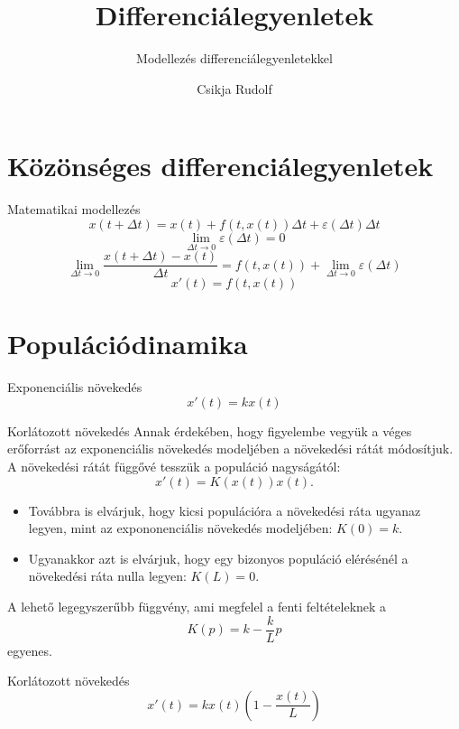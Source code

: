 \documentclass[10pt]{beamer}
\title{Differenciálegyenletek}
\subtitle{Modellezés differenciálegyenletekkel}
\date{}
\author{Csikja Rudolf}
\institute{Budapesti Műszaki és Gazdaságtudományi Egyetem\\Matemaikai Intézet, Analízis Tanszék}
\newcommand{\dlt}{\Delta t}
\begin{document}
\maketitle


\section{Közönséges differenciálegyenletek}
\begin{frame}[t]{Matematikai modellezés}
\[x(t+\dlt) = x(t) + f(t, x(t))\dlt + \varepsilon(\dlt) \dlt\]
 \[\lim_{\dlt \to 0} \varepsilon(\dlt) = 0\]
 \[\lim_{\dlt \to 0} \frac{x(t+\dlt) - x(t)}{\dlt} = f(t, x(t)) + \lim_{\dlt \to 0} \varepsilon(\dlt)\]
  \[x'(t) = f(t, x(t))\]
\end{frame}

\section{Populációdinamika}
\begin{frame}[t]{Exponenciális növekedés}
\[x'(t) = k x(t)\]
\end{frame}

\begin{frame}[t]{Korlátozott növekedés}
Annak érdekében, hogy figyelembe vegyük a véges erőforrást
az exponenciális növekedés modeljében a növekedési rátát módosítjuk.
A növekedési rátát függővé tesszük a populáció nagyságától:
\[x'(t) = K(x(t)) x(t).\]
\begin{itemize}
\item Továbbra is elvárjuk, hogy kicsi populációra a növekedési ráta ugyanaz legyen,
mint az expononenciális növekedés modeljében: $K(0) = k.$
\item Ugyanakkor azt is elvárjuk, hogy egy bizonyos populáció elérésénél a növekedési
ráta nulla legyen: $K(L) = 0.$
\end{itemize}
A lehető legegyszerűbb függvény, ami megfelel a fenti feltételeknek a
\[K(p) = k - \frac{k}{L}p\]
egyenes.
\end{frame}

\begin{frame}[t]{Korlátozott növekedés}
 \[x'(t) = k x(t)\left(1 - \frac{x(t)}{L}\right)\]
\end{frame}
\end{document}
